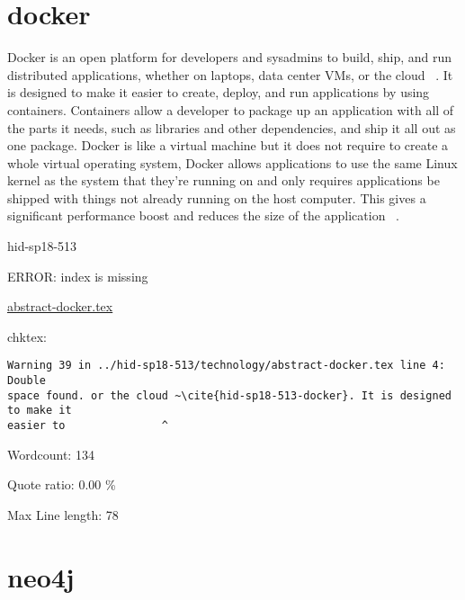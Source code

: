 \section{docker}
Docker is an open platform for developers and sysadmins to build, ship, 
and run distributed applications, whether on laptops, data center VMs, 
or the cloud ~\cite{hid-sp18-513-docker}. It is designed to make it easier to
create, deploy, and run applications by using containers. Containers allow a 
developer to package up an application with all of the parts it needs, 
such as libraries and other dependencies, and ship it all out as one package. 
Docker is like a virtual machine but it does not require to create a whole 
virtual operating system, Docker allows applications to use the same Linux 
kernel as the system that they're running on and only requires applications 
be shipped with things not already running on the host computer. This gives 
a significant performance boost and reduces the size of the application 
~\cite{hid-sp18-513-opensource}.



\begin{IU}

hid-sp18-513

ERROR: index is missing

\href{https://github.com/cloudmesh-community/hid-sp18-513/blob/master//technology/abstract-docker.tex}{abstract-docker.tex}

 
chktex:
\begin{tiny}
\begin{verbatim}
Warning 39 in ../hid-sp18-513/technology/abstract-docker.tex line 4: Double
space found. or the cloud ~\cite{hid-sp18-513-docker}. It is designed to make it
easier to               ^
\end{verbatim}
\end{tiny}

Wordcount: 134


Quote ratio: 0.00 \%
 
Max Line length: 78
\end{IU}

\section{neo4j}

